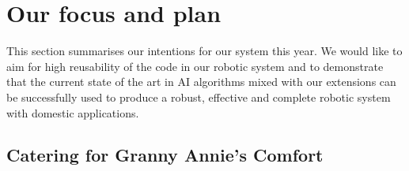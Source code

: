  
\section{Our focus and plan}

This section summarises our intentions for our system this year. We would like to aim for high reusability of the code in our robotic system and to demonstrate that the current state of the art in AI algorithms mixed with our extensions can be successfully used to produce a robust, effective and complete robotic system with domestic applications.  

\subsection{Catering for Granny Annie’s Comfort}





